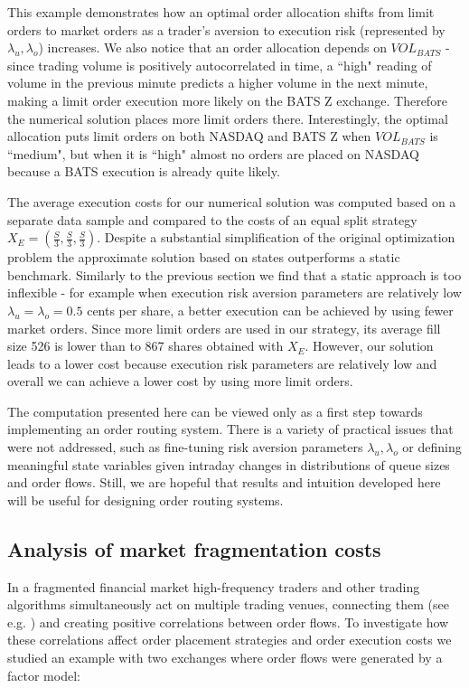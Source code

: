 \documentclass[opre,nonblindrev]{informs3}
\begin{document}
This example demonstrates how an optimal order allocation shifts from  limit orders to market orders as a trader's aversion to execution risk (represented by $\lambda_u,\lambda_o$) increases. We also notice that an order allocation depends on $VOL_{BATS}$ - since trading volume is positively autocorrelated in time, a ``high" reading of volume in the previous minute predicts a higher volume in the next minute, making a limit order execution more likely on the BATS Z exchange. Therefore the numerical solution places more limit orders there. Interestingly, the optimal allocation puts limit orders on both NASDAQ and BATS Z when $VOL_{BATS}$ is ``medium", but when it is ``high" almost no orders are placed on NASDAQ because a BATS execution is already quite  likely.

The average execution costs for our numerical solution was computed based on a separate data sample and compared to the costs of an equal split strategy $X_E = \left(\frac{S}{3},\frac{S}{3},\frac{S}{3}\right)$. Despite a substantial simplification of the original optimization problem the approximate solution based on states outperforms a static benchmark. Similarly to the previous section we find that a static approach is too inflexible - for example when execution risk aversion parameters are relatively low $\lambda_u=\lambda_o=0.5$ cents per share, a better execution can be achieved by using fewer market orders. Since more limit orders are used in our strategy, its average fill size 526 is lower than to 867 shares obtained with $X_E$. However, our solution leads to a lower cost because execution risk parameters are relatively low and overall we can achieve a lower cost by using more limit orders.

The computation presented here can be viewed only as a first step towards implementing an order routing system. There is a variety of practical issues that were not addressed, such as fine-tuning risk aversion parameters $\lambda_u, \lambda_o$ or defining meaningful state variables given intraday changes in distributions of queue sizes and order flows. Still, we are hopeful that results and intuition developed here will be useful for designing order routing systems.

\iffalse
\subsection{Analysis of market fragmentation costs}\label{ssec.fragm}

\noindent In a fragmented financial market high-frequency traders and other trading algorithms simultaneously act on multiple trading venues, connecting them (see e.g. \cite{Menkveld2011}) and creating positive correlations between order flows. To investigate how these correlations affect order placement strategies and order execution costs we studied an example with two exchanges where order flows were generated by a factor model:
\end{document}
